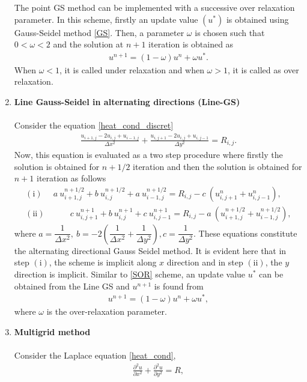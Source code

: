 \documentclass[11pt]{report}
\begin{document}
\begin{enumerate}
The point GS method can be implemented with a successive over relaxation parameter. 
In this scheme, firstly an update value $(u^{*})$ is obtained using Gauss-Seidel method \eqref{GS}. Then, a parameter $\omega$ is chosen such that $0<\omega<2$ and the solution at $n+1$ iteration is obtained as
\begin{align}
u^{n+1}=(1-\omega)u^{n}+\omega u^{*}.\label{SOR}
\end{align}
When $\omega<1$, it is called under relaxation and when $\omega >1$, it is called as over relaxation.
\item \textbf{Line Gauss-Seidel in alternating directions (Line-GS)}\\ \\
Consider the equation \eqref{heat_cond_discret}
\begin{align*}
\frac{u_{i+1,j}-2u_{i,j}+u_{i-1,j}}{\Delta x^2}+\frac{u_{i,j+1}-2u_{i,j}+u_{i,j-1}}{\Delta y^2}=R_{i,j}.
\end{align*}
Now, this equation is evaluated as a two step procedure where firstly the solution is obtained for $n+1/2$ iteration and then the solution is obtained for $n+1$ iteration as follows
\begin{align*}
(\mathrm{i}) &\ a \ u^{n+1/2}_{i+1,j}+b \ u^{n+1/2}_{i,j}+a \ u^{n+1/2}_{i-1,j}=R_{i,j}-c \ (u^{n}_{i,j+1}+u^{n}_{i,j-1}),\\
(\mathrm{ii}) &\mspace{40mu} c \ u^{n+1}_{i,j+1}+b \ u^{n+1}_{i,j}+c \ u^{n+1}_{i,j-1}=R_{i,j}-a \ (u^{n+1/2}_{i+1,j}+u^{n+1/2}_{i-1,j}),
\end{align*}
where $a=\dfrac{1}{\Delta x^2}, \ b=-2\left(\dfrac{1}{\Delta x^2}+\dfrac{1}{\Delta y^2}\right), c=\dfrac{1}{\Delta y^2}$. 
These equations constitute the alternating directional Gauss Seidel method. It is evident here that in step $(\mathrm{i})$, the scheme is implicit along $x$ direction and in step $(\mathrm{ii})$, the $y$ direction is implicit.
Similar to \eqref{SOR} scheme, an update value $u^*$ can be obtained from the Line GS and $u^{n+1}$ is found from
\begin{align*}
u^{n+1}=(1-\omega)u^{n}+\omega u^{*},
\end{align*}
where $\omega$ is the over-relaxation parameter.
\item \textbf{Multigrid method}\\ \\
Consider the Laplace equation \eqref{heat_cond},
\begin{align*}
\frac{\partial^2 u}{\partial x^2}+\frac{\partial^2 u}{\partial y^2}=R,
\end{align*}

\end{enumerate}
\end{document}
